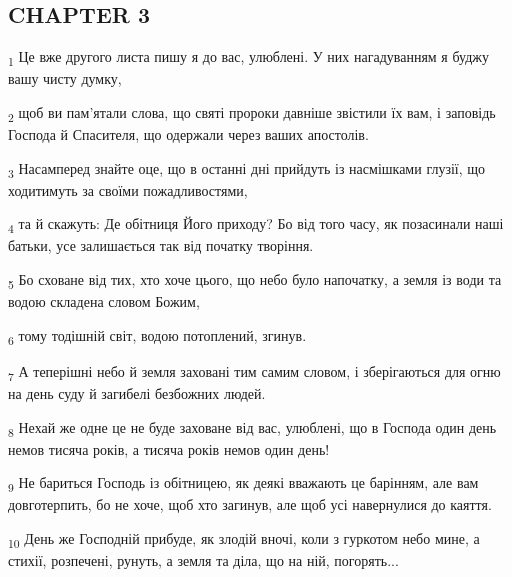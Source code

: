 \subsection{CHAPTER 3}
\begin{tcolorbox}
\textsubscript{1} Це вже другого листа пишу я до вас, улюблені. У них нагадуванням я буджу вашу чисту думку,
\end{tcolorbox}
\begin{tcolorbox}
\textsubscript{2} щоб ви пам'ятали слова, що святі пророки давніше звістили їх вам, і заповідь Господа й Спасителя, що одержали через ваших апостолів.
\end{tcolorbox}
\begin{tcolorbox}
\textsubscript{3} Насамперед знайте оце, що в останні дні прийдуть із насмішками глузії, що ходитимуть за своїми пожадливостями,
\end{tcolorbox}
\begin{tcolorbox}
\textsubscript{4} та й скажуть: Де обітниця Його приходу? Бо від того часу, як позасинали наші батьки, усе залишається так від початку творіння.
\end{tcolorbox}
\begin{tcolorbox}
\textsubscript{5} Бо сховане від тих, хто хоче цього, що небо було напочатку, а земля із води та водою складена словом Божим,
\end{tcolorbox}
\begin{tcolorbox}
\textsubscript{6} тому тодішній світ, водою потоплений, згинув.
\end{tcolorbox}
\begin{tcolorbox}
\textsubscript{7} А теперішні небо й земля заховані тим самим словом, і зберігаються для огню на день суду й загибелі безбожних людей.
\end{tcolorbox}
\begin{tcolorbox}
\textsubscript{8} Нехай же одне це не буде заховане від вас, улюблені, що в Господа один день немов тисяча років, а тисяча років немов один день!
\end{tcolorbox}
\begin{tcolorbox}
\textsubscript{9} Не бариться Господь із обітницею, як деякі вважають це барінням, але вам довготерпить, бо не хоче, щоб хто загинув, але щоб усі навернулися до каяття.
\end{tcolorbox}
\begin{tcolorbox}
\textsubscript{10} День же Господній прибуде, як злодій вночі, коли з гуркотом небо мине, а стихії, розпечені, рунуть, а земля та діла, що на ній, погорять...
\end{tcolorbox}

